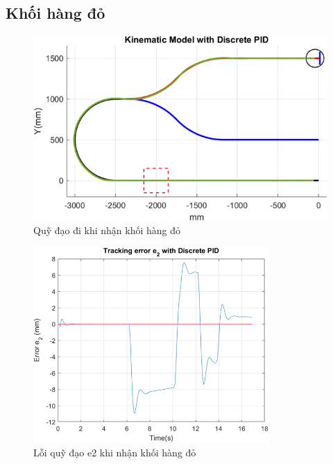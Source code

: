           \subsection{Khối hàng đỏ}
               \begin{figure}[H]
                    \centering
                    \includegraphics[width=1\textwidth]{pictures/chapter8/trajec_red.png}
                    \caption{Quỹ đạo đi khi nhận khối hàng đỏ}
                    \label{tra_red}
               \end{figure}
               \begin{figure}[H]
                    \centering
                    \includegraphics[width=0.8\textwidth]{pictures/chapter8/err_red.png}
                    \caption{Lỗi quỹ đạo e2 khi nhận khối hàng đỏ}
                    \label{err_red}
               \end{figure}
